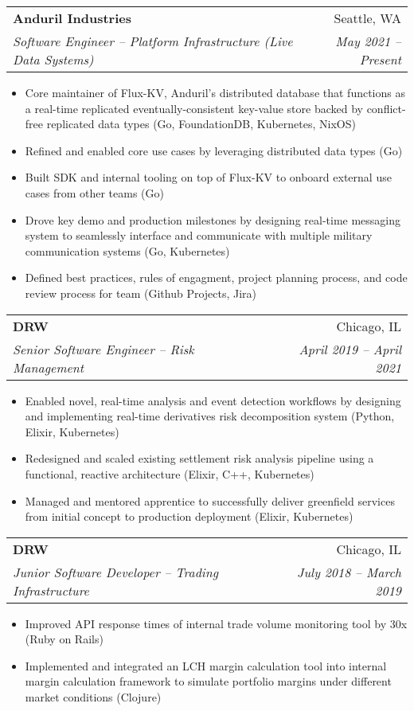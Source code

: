 \documentclass[letterpaper,11pt]{article}
\makeatletter
\newcommand{\resitem}[1]{\item #1 \vspace{-2pt}}
\newcommand{\ressubheading}[4]{
\begin{tabular*}{6.875in}{l@{\extracolsep{\fill}}r}
		\textbf{#1} & #2 \\
		\textit{#3} & \textit{#4} \\
\end{tabular*}\vspace{-6pt}}
\renewcommand{\footnotesize}{\fontsize{10pt}{11pt}\selectfont}
\makeatother
\begin{document}
		\begin{description}
			\item
			\ressubheading{Anduril Industries}{Seattle, WA}
			{Software Engineer -- Platform Infrastructure (Live Data Systems)}{May 2021 -- Present}
			{	
				\footnotesize
				\begin{itemize}
					\resitem{Core maintainer of Flux-KV, Anduril's distributed database that functions as a real-time replicated eventually-consistent key-value store backed by conflict-free replicated data types (Go, FoundationDB, Kubernetes, NixOS)}
					\resitem{Refined and enabled core use cases by leveraging distributed data types (Go)}
					\resitem{Built SDK and internal tooling on top of Flux-KV to onboard external use cases from other teams (Go)}
					\resitem{Drove key demo and production milestones by designing real-time messaging system to seamlessly interface and communicate with multiple military communication systems (Go, Kubernetes)}
					\resitem{Defined best practices, rules of engagment, project planning process, and code review process for team (Github Projects, Jira)}
				\end{itemize}
			}
			\item
			\ressubheading{DRW}{Chicago, IL}
			{Senior Software Engineer -- Risk Management}{April 2019 -- April 2021}
			{	
				\footnotesize
				\begin{itemize}
					\resitem{Enabled novel, real-time analysis and event detection workflows by designing and implementing real-time derivatives risk decomposition system  (Python, Elixir, Kubernetes)}
					\resitem{Redesigned and scaled existing settlement risk analysis pipeline using a functional, reactive architecture (Elixir, C++, Kubernetes)}
					\resitem{Managed and mentored apprentice to successfully deliver greenfield services from initial concept to production deployment (Elixir, Kubernetes)}
				\end{itemize}
			}
			\item
			\ressubheading{DRW}{Chicago, IL}
			{Junior Software Developer -- Trading Infrastructure}{July 2018 -- March 2019}
			{	
				\footnotesize
				\begin{itemize}
					\resitem{Improved API response times of internal trade volume monitoring tool by 30x (Ruby on Rails)}
					\resitem{Implemented and integrated an LCH margin calculation tool into internal margin calculation framework to simulate portfolio margins under different market conditions (Clojure)}
				\end{itemize}
			}
			\item 

\end{description}
\end{document}
